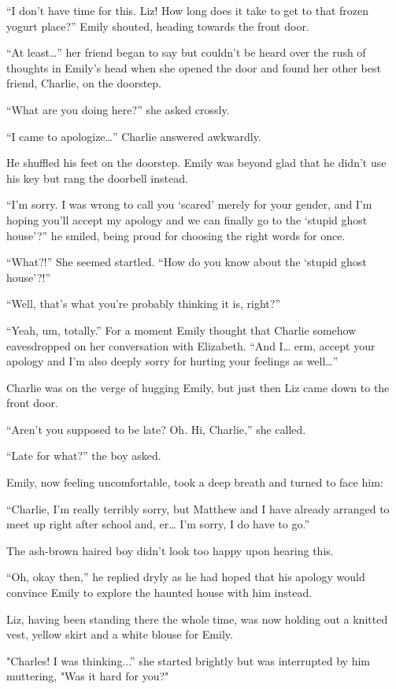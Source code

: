 “I don’t have time for this. Liz! How long does it take to get to that frozen yogurt place?” Emily shouted, heading towards the front door.

“At least…” her friend began to say but couldn’t be heard over the rush of thoughts in Emily’s head when she opened the door and found her other best friend, Charlie, on the doorstep.

“What are you doing here?” she asked crossly.

“I came to apologize…” Charlie answered awkwardly.

He shuffled his feet on the doorstep. Emily was beyond glad that he didn’t use his key but rang the doorbell instead.

“I’m sorry. I was wrong to call you ‘scared’ merely for your gender, and I’m hoping you’ll accept my apology and we can finally go to the ‘stupid ghost house’?” he smiled, being proud for choosing the right words for once.

“What?!” She seemed startled. “How do you know about the ‘stupid ghost house’?!”

“Well, that’s what you’re probably thinking it is, right?”

“Yeah, um, totally.” For a moment Emily thought that Charlie somehow eavesdropped on her conversation with Elizabeth. “And I… erm, accept your apology and I’m also deeply sorry for hurting your feelings as well…”

Charlie was on the verge of hugging Emily, but just then Liz came down to the front door.
  
“Aren’t you supposed to be late? Oh. Hi, Charlie,” she called.

“Late for what?” the boy asked.
  
Emily, now feeling uncomfortable, took a deep breath and turned to face him:

“Charlie, I’m really terribly sorry, but Matthew and I have already arranged to meet up right after school and, er… I’m sorry, I do have to go.”

The ash-brown haired boy didn’t look too happy upon hearing this.

“Oh, okay then,” he replied dryly as he had hoped that his apology would convince Emily to explore the haunted house with him instead.

Liz, having been standing there the whole time, was now holding out a knitted vest, yellow skirt and a white blouse for Emily.

"Charles! I was thinking...” she started brightly but was interrupted by him muttering, "Was it hard for you?"


